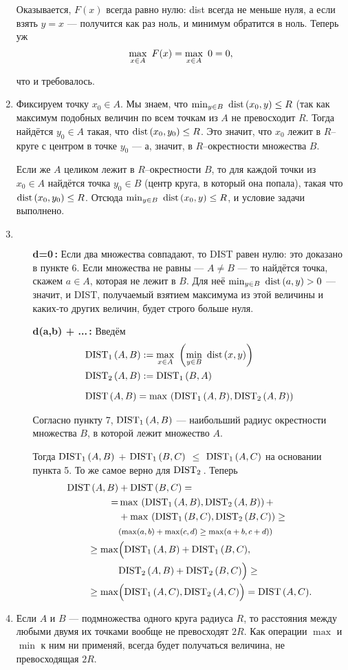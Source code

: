 \begin{enumerate}
Оказывается, $F(x)$ всегда равно нулю: dist всегда не меньше нуля, а если взять $y=x$ — получится как раз ноль, и минимум обратится в ноль. Теперь уж
$$\max\limits_{x\in A}\ F(x) = \max\limits_{x \in A}\ 0 = 0,$$

что и требовалось.

\item Фиксируем точку $x_0 \in A$. Мы знаем, что $\min_{y \in B}\ \mathrm{dist}\, (x_0,y) \le R$ (так как максимум подобных величин по всем точкам из $A$ не превосходит $R$. Тогда найдётся $y_0 \in A$ такая, что $\mathrm{dist}\,(x_0, y_0) \le R$. Это значит, что $x_0$ лежит в $R$--круге с центром в точке $y_0$ — а, значит, в $R$--окрестности множества $B$.

Если же $A$ целиком лежит в $R$--окрестности $B$, то для каждой точки из $x_0 \in A$ найдётся точка $y_0 \in B$ (центр круга, в который она попала), такая что $\mathrm{dist}\, (x_0, y_0) \le R$. Отсюда $\min_{y \in B}\ \mathrm{dist}\, (x_0,y) \le R$, и условие задачи выполнено.

\item $\phantom{x}$

\begin{enumerate}
	\item[\bfseries d=0\,:] Если два множества совпадают, то DIST равен нулю: это доказано в пункте 6. Если множества не равны — $A \ne B$ — то найдётся точка, скажем $a \in A$, которая не лежит в $B$. Для неё $\min_{y \in B}\ \mathrm{dist}\,(a,y) >0$ — значит, и DIST, получаемый взятием максимума из этой величины и каких-то других величин, будет строго больше нуля.
	\item[\bfseries d(a,b) + ...\,:] Введём
	\begin{align*}
		& \Dfst(A,B) := \max\l{x \in A}\ \ll\min\l{y \in B}\ \dist (x,y)\rr \\
		& \Dsnd(A,B) := \Dfst (B,A)
			\vphantom{\min\l{y \in B}}\\
		& \Dist(A,B) = \max\,\ll\Dfst(A,B), \Dsnd(A,B)\rr
	\end{align*}

Согласно пункту 7, $\mathrm{DIST}_1\, (A,B)$ — наибольший радиус окрестности множества $B$, в которой лежит множество $A$.

Тогда $\mathrm{DIST}_1\, (A,B)$ $+$ $\mathrm{DIST}_1\, (B,C)$ $\le$ $\mathrm{DIST}_1\,(A,C)$ на основании пункта 5. То же самое верно для $\mathrm{DIST}_2\,$. Теперь
\begin{align*}
	\mathrm{DIST}\,(A,B) & + \mathrm{DIST}\,(B,C) = \\
	=& \max\,\left(\mathrm{DIST}_1\,(A,B), \mathrm{DIST}_2\,(A,B) \right) + \\
	&+ \max\,\left(\mathrm{DIST}_1\,(B,C), \mathrm{DIST}_2\,(B,C) \right) \ge \\
	& \text{\footnotesize ($\max(a,b) + \max(c,d) \ge \max(a+b,c+d)$)} \\
	\ge \max & \Bigl( \mathrm{DIST}_1\,(A,B) + \mathrm{DIST}_1\,(B,C),\\
		& \mathrm{DIST}_2\,(A,B) + \mathrm{DIST}_2\,(B,C)\Bigr) \ge \\
	\ge \max & \Bigl( \mathrm{DIST}_1\,(A,C), \mathrm{DIST}_2\,(A,C) \Bigr) = \mathrm{DIST}\,(A,C).
\end{align*}
\end{enumerate}

\item Если $A$ и $B$ — подмножества одного круга радиуса $R$, то расстояния между любыми двумя их точками вообще не превосходят $2R$. Как операции $\max$ и $\min$ к ним ни применяй, всегда будет получаться величина, не превосходящая $2R$.
\end{enumerate}